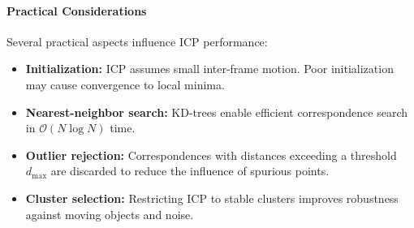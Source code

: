 \paragraph{Practical Considerations}
Several practical aspects influence ICP performance:
\begin{itemize}
    \item \textbf{Initialization:} ICP assumes small inter-frame motion. Poor initialization may cause convergence to local minima.
    \item \textbf{Nearest-neighbor search:} KD-trees enable efficient correspondence search in $\mathcal{O}(N \log N)$ time.
    \item \textbf{Outlier rejection:} Correspondences with distances exceeding a threshold $d_{\max}$ are discarded to reduce the influence of spurious points.
    \item \textbf{Cluster selection:} Restricting ICP to stable clusters improves robustness against moving objects and noise.
\end{itemize}

